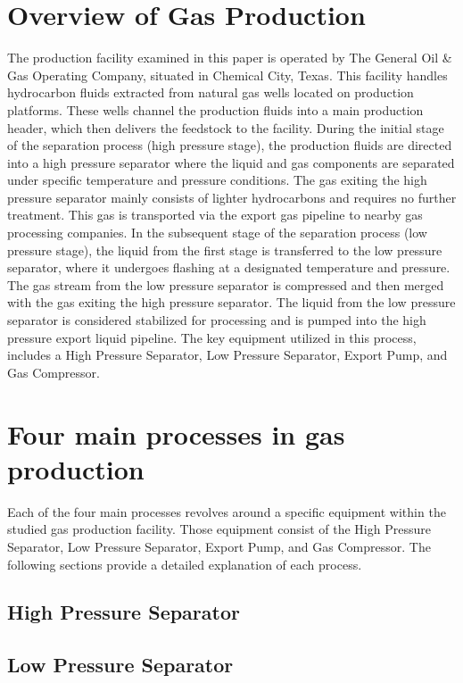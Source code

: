 \documentclass[conference]{IEEEtran}
\begin{document}
\section{Overview of Gas Production}

The production facility examined in this paper is operated by The General Oil \& Gas Operating Company, situated in Chemical City, Texas. This facility handles hydrocarbon fluids extracted from natural gas wells located on production platforms. These wells channel the production fluids into a main production header, which then delivers the feedstock to the facility. During the initial stage of the separation process (high pressure stage), the production fluids are directed into a high pressure separator where the liquid and gas components are separated under specific temperature and pressure conditions. The gas exiting the high pressure separator mainly consists of lighter hydrocarbons and requires no further treatment. This gas is transported via the export gas pipeline to nearby gas processing companies. In the subsequent stage of the separation process (low pressure stage), the liquid from the first stage is transferred to the low pressure separator, where it undergoes flashing at a designated temperature and pressure. The gas stream from the low pressure separator is compressed and then merged with the gas exiting the high pressure separator. The liquid from the low pressure separator is considered stabilized for processing and is pumped into the high pressure export liquid pipeline. The key equipment utilized in this process, includes a High Pressure Separator, Low Pressure Separator, Export Pump, and Gas Compressor.

\section{Four main processes in gas production}
Each of the four main processes revolves around a specific equipment within the studied gas production facility. Those equipment consist of the High Pressure Separator, Low Pressure Separator, Export Pump, and Gas Compressor. The following sections provide a detailed explanation of each process.

\subsection{High Pressure Separator}\label{HPS}

\subsection{Low Pressure Separator}\label{LPS}
\end{document}
